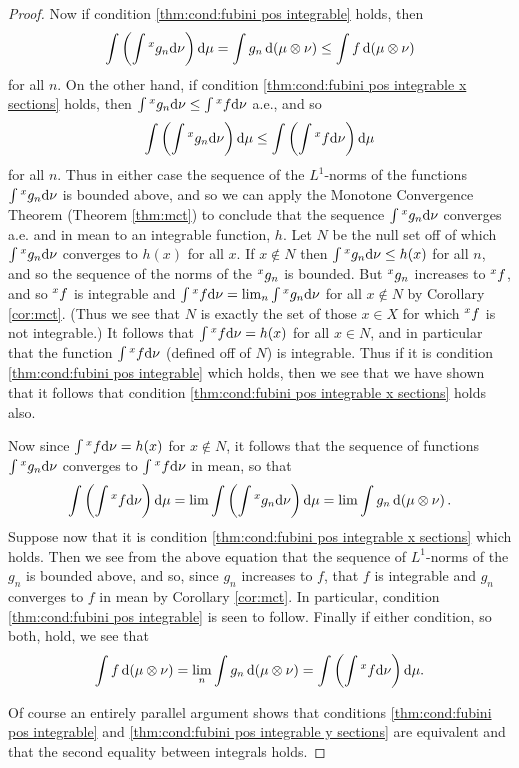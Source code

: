 \begin{proof}
Now if condition \ref{thm:cond:fubini pos integrable} holds, then \[\int\br{\int\xsec{g_n}{x}\dd\nu}\dd\mu=\int g_n\dd(\mu\otimes\nu)\leq\int f\dd(\mu\otimes\nu)\] for all $n$. On the other hand, if condition \ref{thm:cond:fubini pos integrable x sections} holds, then $\int\xsec{g_n}{x}\dd\nu\leq\int\xsec{f}{x}\dd\nu$ a.e., and so \[\int\br{\int\xsec{g_n}{x}\dd\nu}\dd\mu\leq\int\br{\int\xsec{f}{x}\dd\nu}\dd\mu\] for all $n$. Thus in either case the sequence of the $L^1$-norms of the functions $\int\xsec{g_n}{x}\dd\nu$ is bounded above, and so we can apply the Monotone Convergence Theorem (Theorem \ref{thm:mct}) to conclude that the sequence $\int\xsec{g_n}{x}\dd\nu$ converges a.e. and in mean to an integrable function, $h$. Let $N$ be the null set off of which $\int\xsec{g_n}{x}\dd\nu$ converges to $h(x)$ for all $x$. If $x\notin N$ then $\int\xsec{g_n}{x}\dd\nu\leq h(x)$ for all $n$, and so the sequence of the norms of the $\xsec{g_n}{x}$ is bounded. But $\xsec{g_n}{x}$ increases to $\xsec{f}{x}$, and so $\xsec{f}{x}$ is integrable and $\int\xsec{f}{x}\dd\nu=\lim_n\int\xsec{g_n}{x}\dd\nu$ for all $x\notin N$ by Corollary \ref{cor:mct}. (Thus we see that $N$ is exactly the set of those $x\in X$ for which $\xsec{f}{x}$ is not integrable.) It follows that $\int\xsec{f}{x}\dd\nu=h(x)$ for all $x\in N$, and in particular that the function $\int\xsec{f}{x}\dd\nu$ (defined off of $N$) is integrable. Thus if it is condition \ref{thm:cond:fubini pos integrable} which holds, then we see that we have shown that it follows that condition \ref{thm:cond:fubini pos integrable x sections} holds also.

Now since $\int\xsec{f}{x}\dd\nu=h(x)$ for $x\notin N$, it follows that the sequence of functions $\int\xsec{g_n}{x}\dd\nu$ converges to $\int\xsec{f}{x}\dd\nu$ in mean, so that \[\int\br{\int\xsec{f}{x}\dd\nu}\dd\mu=\lim\int\br{\int\xsec{g_n}{x}\dd\nu}\dd\mu=\lim\int g_n\dd(\mu\otimes\nu).\] Suppose now that it is condition \ref{thm:cond:fubini pos integrable x sections} which holds. Then we see from the above equation that the sequence of $L^1$-norms of the $g_n$ is bounded above, and so, since $g_n$ increases to $f$, that $f$ is integrable and $g_n$ converges to $f$ in mean by Corollary \ref{cor:mct}. In particular, condition \ref{thm:cond:fubini pos integrable} is seen to follow. Finally if either condition, so both, hold, we see that \[\int f\dd(\mu\otimes\nu)=\lim_n\int g_n\dd(\mu\otimes\nu)=\int\br{\int\xsec{f}{x}\dd\nu}\dd\mu.\]

Of course an entirely parallel argument shows that conditions \ref{thm:cond:fubini pos integrable} and \ref{thm:cond:fubini pos integrable y sections} are equivalent and that the second equality between integrals holds.
\end{proof}


